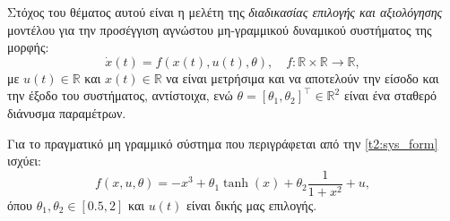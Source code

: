 \documentclass[12pt]{article} %
\numberwithin{equation}{section}  %
\begin{document}
Στόχος του θέματος αυτού είναι η μελέτη της \textit{διαδικασίας επιλογής και αξιολόγησης} μοντέλου 
για την προσέγγιση αγνώστου μη-γραμμικού δυναμικού συστήματος της μορφής:
\begin{equation}\label{t2:sys_form}
    \dot x (t) = f(x(t), u(t), \theta), \quad f: \mathbb{R} \times \mathbb{R} \rightarrow \mathbb{R}, 
\end{equation}
με $u(t) \in \mathbb{R}$ και $x(t)\in \mathbb{R}$ να είναι μετρήσιμα και να αποτελούν την είσοδο και την έξοδο του συστήματος, αντίστοιχα, ενώ
$\theta = [\theta_1, \theta_2]^{\top} \in \mathbb{R}^2$ είναι ένα σταθερό διάνυσμα παραμέτρων. 

Για το πραγματικό μη γραμμικό σύστημα που περιγράφεται από την \eqref{t2:sys_form} ισχύει:
\begin{equation}\label{t2:f_true}
    f(x, u, \theta) = - x^3 + \theta_1 \tanh(x) + \theta_2 \frac{1}{1 + x^2} + u, 
\end{equation}
όπου $\theta_1, \theta_2 \in [0.5, 2]$ και $u(t)$ είναι δικής μας επιλογής. 


\newpage
\end{document}
